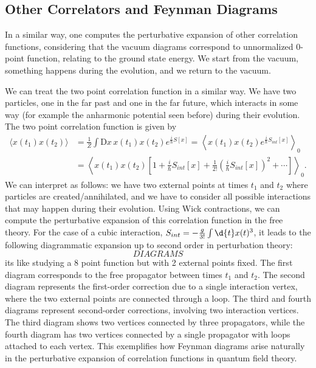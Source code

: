 \subsection{Other Correlators and Feynman Diagrams}
In a similar way, one computes the perturbative expansion of other correlation functions, considering that the vacuum diagrams correspond to unnormalized 0-point function, relating to the ground state energy. We start from the vacuum, something happens during the evolution, and we return to the vacuum.

We can treat the two point correlation function in a similar way. We have two particles, one in the far past and one in the far future, which interacts in some way (for example the anharmonic potential seen before) during their evolution. The two point correlation function is given by
\[
    \begin{aligned}
        \langle x(t_1) x(t_2) \rangle & = \frac{1}{Z} \int \mathrm{D}x\, x(t_1) x(t_2) e^{\frac{i}{\hbar}S[x]} = \left\langle x(t_1) x(t_2) e^{\frac{i}{\hbar} S_{int}[x]} \right\rangle_{0}              \\
                                      & = \left\langle x(t_1) x(t_2) \left[ 1 + \frac{i}{\hbar} S_{int}[x] + \frac{1}{2!} \left( \frac{i}{\hbar} S_{int}[x] \right)^2 + \cdots \right] \right\rangle_{0}.
    \end{aligned}
\]
We can interpret as follows: we have two external points at times \(t_1\) and \(t_2\) where particles are created/annihilated, and we have to consider all possible interactions that may happen during their evolution. Using Wick contractions, we can compute the perturbative expansion of this correlation function in the free theory. For the case of a cubic interaction, \(S_{int} = -\frac{g}{3!}\int\d{t}x(t)^3\), it leads to the following diagrammatic expansion up to second order in perturbation theory:
\[
    DIAGRAMS
\]
its like studying a 8 point function but with 2 external points fixed.
The first diagram corresponds to the free propagator between times \(t_1\) and \(t_2\). The second diagram represents the first-order correction due to a single interaction vertex, where the two external points are connected through a loop. The third and fourth diagrams represent second-order corrections, involving two interaction vertices. The third diagram shows two vertices connected by three propagators, while the fourth diagram has two vertices connected by a single propagator with loops attached to each vertex. This exemplifies how Feynman diagrams arise naturally in the perturbative expansion of correlation functions in quantum field theory.

